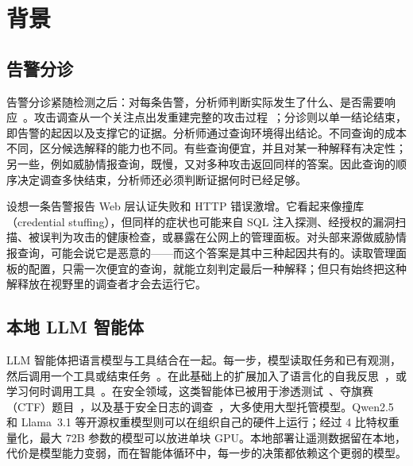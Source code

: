 \section{背景}
\label{sec:background}

\subsection{告警分诊}
告警分诊紧随检测之后：对每条告警，分析师判断实际发生了什么、是否需要响应~\citep{nodoze}。攻击调查从一个关注点出发重建完整的攻击过程~\citep{kairos,clouseau}；分诊则以单一结论结束，即告警的起因以及支撑它的证据。分析师通过查询环境得出结论。不同查询的成本不同，区分候选解释的能力也不同。有些查询便宜，并且对某一种解释有决定性；另一些，例如威胁情报查询，既慢，又对多种攻击返回同样的答案。因此查询的顺序决定调查多快结束，分析师还必须判断证据何时已经足够。

设想一条告警报告 Web 层认证失败和 HTTP 错误激增。它看起来像撞库（credential stuffing），但同样的症状也可能来自 SQL 注入探测、经授权的漏洞扫描、被误判为攻击的健康检查，或暴露在公网上的管理面板。对头部来源做威胁情报查询，可能会说它是恶意的——而这个答案是其中三种起因共有的。读取管理面板的配置，只需一次便宜的查询，就能立刻判定最后一种解释；但只有始终把这种解释放在视野里的调查者才会去运行它。

\subsection{本地 LLM 智能体}
LLM 智能体把语言模型与工具结合在一起。每一步，模型读取任务和已有观测，然后调用一个工具或结束任务~\citep{react}。在此基础上的扩展加入了语言化的自我反思~\citep{reflexion}，或学习何时调用工具~\citep{toolformer}。在安全领域，这类智能体已被用于渗透测试~\citep{pentestgpt}、夺旗赛（CTF）题目~\citep{cybench}，以及基于安全日志的调查~\citep{excytin,clouseau}，大多使用大型托管模型。Qwen2.5 和 Llama~3.1 等开源权重模型则可以在组织自己的硬件上运行；经过 4 比特权重量化，最大 72B 参数的模型可以放进单块 GPU。本地部署让遥测数据留在本地，代价是模型能力变弱，而在智能体循环中，每一步的决策都依赖这个更弱的模型。
